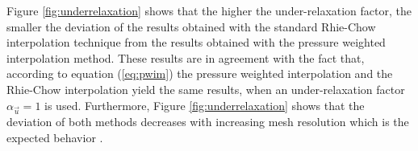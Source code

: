 Figure \ref{fig:underrelaxation} shows that the higher the under-relaxation factor, the smaller the deviation of the results obtained with the standard Rhie-Chow interpolation technique from the results obtained with the pressure weighted interpolation method. These results are in agreement with the fact that, according to equation (\ref{eq:pwim}) the pressure weighted interpolation and the Rhie-Chow interpolation yield the same results, when an under-relaxation factor \(\alpha_\vec{u} = 1\) is used. Furthermore, Figure \ref{fig:underrelaxation} shows that the deviation of both methods decreases with increasing mesh resolution which is the expected behavior \cite{ferziger02}.


